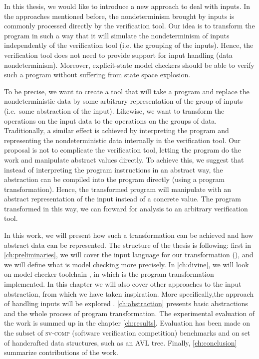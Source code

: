 In this thesis, we would like to introduce a new approach to deal with inputs.
In the approaches mentioned before, the nondeterminism brought by inputs is
commonly processed directly by the verification tool. Our idea is to transform
the program in such a way that it will simulate the nondeterminism of inputs
independently of the verification tool (i.e. the grouping of the inputs). Hence,
the verification tool does not need to provide support for input handling (data
nondeterminism). Moreover, explicit-state model checkers should be able
to verify such a program without suffering from state space explosion.

To be precise, we want to create a tool that will take a program and replace the
nondeterministic data by some arbitrary representation of the group of inputs
(i.e.~some abstraction of the input).  Likewise, we want to transform the
operations on the input data to the operations on the groups of
data. Traditionally, a similar
effect is achieved by interpreting the program and representing the
nondeterministic data internally in the verification tool. Our proposal is
not to complicate the verification tool, letting the program do the work and
manipulate abstract values directly. To achieve this, we suggest that
instead of interpreting the program instructions in an abstract way, the
abstraction can be compiled into the program directly (using a program
transformation). Hence, the transformed program will manipulate with
an abstract representation of the input instead of a concrete value.
The program transformed in this way, we can forward for analysis to
an arbitrary verification tool.

In this work, we will present how such a transformation can be achieved and how
abstract data can be represented. The structure of the thesis is following:
first in \autoref{ch:preliminaries}, we will cover the input language for our
transformation (\LLVM), and we will define what is model checking more
precisely. In \autoref{ch:divine}, we will look on \DIVINE model checker
toolchain \cite{Divine17}, in which is the program transformation implemented.
In this chapter we will also cover other approaches to the input abstraction,
from which we have taken inspiration. More specifically,the \SymDIVINE
approach of handling inputs will be explored \cite{Mrazek16}. \autoref{ch:abstraction}
presents basic abstractions and the whole process of program transformation.
The experimental evaluation of the work is summed up in the chapter
\autoref{ch:results}.  Evaluation has been made on the subset of
\textsc{sv-comp} (software verification competition) benchmarks
\cite{Beyer17} and on set of handcrafted data structures, such as an AVL
tree. Finally, \autoref{ch:conclusion} summarize contributions of the work.

